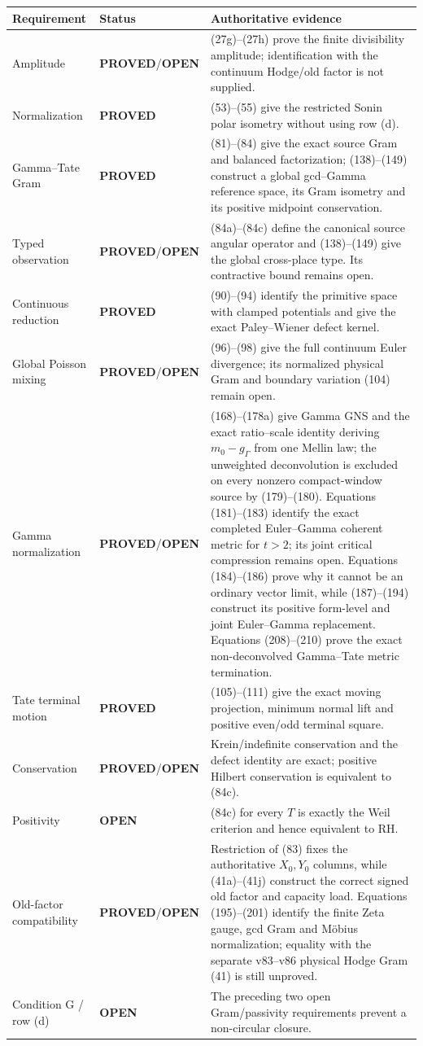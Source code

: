\documentclass[11pt]{article}
\newcommand{\PROVED}{\textcolor{green!45!black}{\textbf{PROVED}}}
\newcommand{\OPEN}{\textcolor{red!70!black}{\textbf{OPEN}}}
\begin{document}
\begin{center}
\begin{tabular}{p{}p{}p{}}
\hline
Requirement & Status & Authoritative evidence \\
\hline
Amplitude & \PROVED/\OPEN & (27g)--(27h) prove the finite divisibility
amplitude; identification with the continuum Hodge/old factor is not supplied.
\\
Normalization & \PROVED & (53)--(55) give the restricted Sonin polar
isometry without using row (d). \\
Gamma--Tate Gram & \PROVED & (81)--(84) give the exact source Gram and
balanced factorization; (138)--(149) construct a global gcd--Gamma reference
space, its Gram isometry and its positive midpoint conservation. \\
Typed observation & \PROVED/\OPEN & (84a)--(84c) define the canonical source
angular operator and (138)--(149) give the global cross-place type.  Its
contractive bound remains open.
\\
Continuous reduction & \PROVED & (90)--(94) identify the primitive space
with clamped potentials and give the exact Paley--Wiener defect kernel. \\
Global Poisson mixing & \PROVED/\OPEN & (96)--(98) give the full continuum
Euler divergence; its normalized physical Gram and boundary variation (104)
remain open. \\
Gamma normalization & \PROVED/\OPEN & (168)--(178a) give Gamma GNS and the
exact ratio--scale identity deriving $m_0-g_\Gamma$ from one Mellin law;
the unweighted deconvolution is excluded on every nonzero compact-window
source by (179)--(180).  Equations (181)--(183) identify the exact completed
Euler--Gamma coherent metric for $t>2$; its joint critical compression remains
open.  Equations (184)--(186) prove why it cannot be an ordinary vector
limit, while (187)--(194) construct its positive form-level and joint
Euler--Gamma replacement.  Equations (208)--(210) prove the exact
non-deconvolved Gamma--Tate metric termination. \\
Tate terminal motion & \PROVED & (105)--(111) give the exact moving
projection, minimum normal lift and positive even/odd terminal square. \\
Conservation & \PROVED/\OPEN & Krein/indefinite conservation and the defect
identity are exact; positive Hilbert conservation is equivalent to (84c). \\
Positivity & \OPEN & (84c) for every $T$ is exactly the Weil criterion and
hence equivalent to RH. \\
Old-factor compatibility & \PROVED/\OPEN & Restriction of (83) fixes the
authoritative $X_0,Y_0$ columns, while (41a)--(41j) construct the correct
signed old factor and capacity load.  Equations (195)--(201) identify the
finite Zeta gauge, gcd Gram and M\"obius normalization; equality with the
separate v83--v86 physical Hodge Gram (41) is still unproved. \\
Condition G / row (d) & \OPEN & The preceding two open Gram/passivity
requirements prevent a non-circular closure. \\
\hline
\end{tabular}
\end{center}
\end{document}
